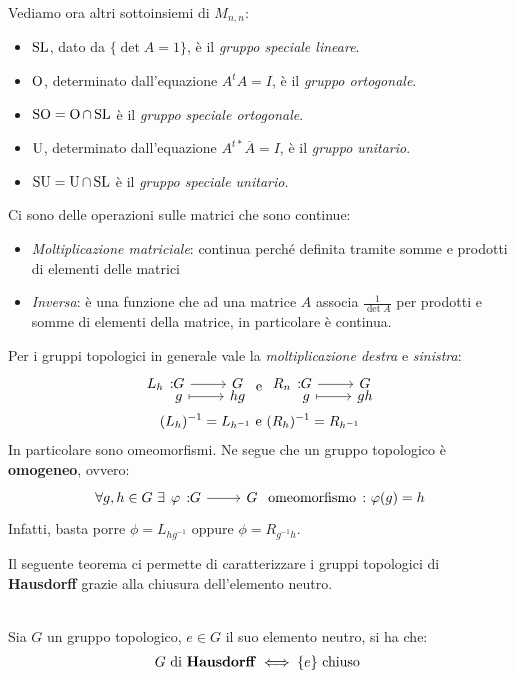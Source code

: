 Vediamo ora altri sottoinsiemi di $M_{n,n}$:
	\begin{itemize}
		\item $\operatorname{SL}$, dato da $\{\det A=1\} $, è il \textit{gruppo speciale lineare}.
		\item $\operatorname{O}$, determinato dall'equazione $A^{t}A=I$, è il \textit{gruppo ortogonale}.
		\item $\operatorname{SO}=\operatorname{O}\cap\operatorname{SL}$ è il \textit{gruppo speciale ortogonale}.
		\item $\operatorname{U}$, determinato dall'equazione $A^{t*}\overline{A}=I$, è il \textit{gruppo unitario}.
		\item $\operatorname{SU}=\operatorname{U}\cap\operatorname{SL}$ è il \textit{gruppo speciale unitario}.
	\end{itemize}
Ci sono delle operazioni sulle matrici che sono continue:
	\begin{itemize}
		\item \textit{Moltiplicazione matriciale}: continua perché definita tramite somme e prodotti di elementi delle matrici
		\item \textit{Inversa}: è una funzione che ad una matrice $A$ associa $\displaystyle \frac{1}{\det A}$ per prodotti e somme di elementi della matrice, in particolare è continua.
	\end{itemize}
\begin{observe}
	Per i gruppi topologici in generale vale la \textit{moltiplicazione destra} e \textit{sinistra}:
		\begin{gather*}
			\funztot {L_h} G G g {hg} \text{   e   } \funztot {R_n}  G G g {gh} \\
			(L_h)^{-1}=L_{h^{-1}} \text{   e   } (R_h)^{-1}=R_{h^{-1}}
		\end{gather*}
	In particolare sono omeomorfismi. Ne segue che un gruppo topologico è \textbf{omogeneo}, ovvero:
		\begin{gather*}
			\forall g,h\in G \ \exists \funz \phi G G \text{ omeomorfismo}\ \colon \phi(g)=h
		\end{gather*}
	Infatti, basta porre $\phi=L_{hg^{-1}}$ oppure $\phi=R_{g^{-1}h}$.
\end{observe}
Il seguente teorema ci permette di caratterizzare i gruppi topologici di \textbf{Hausdorff} grazie alla chiusura dell'elemento neutro.
\begin{theorema}~{}\\
	Sia $G$ un gruppo topologico, $e\in G$ il suo elemento neutro, si ha che:
		\begin{gather*}
			G \ \text{di \textbf{Hausdorff}} \iff \{e\} \text{ chiuso }
		\end{gather*}
	\vspace{-6mm}
\end{theorema}
